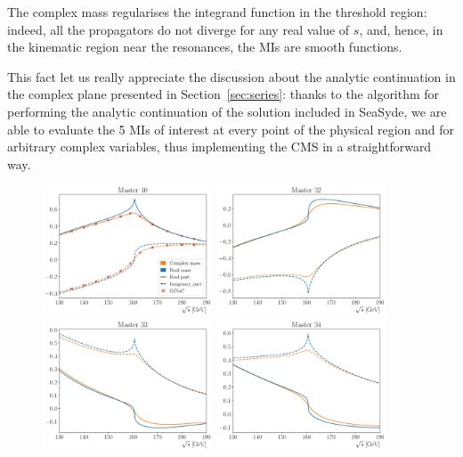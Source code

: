\documentclass[final,1p,times]{elsarticle}
\begin{document}
The complex mass regularises the integrand function in the threshold region: indeed, all the propagators
\be
\ee
do not diverge for any real value of $s$, and, hence, in the kinematic region near the resonances, the MIs are smooth functions.

This fact let us really appreciate the discussion about the analytic continuation in the complex plane presented in Section~\ref{sec:series}:
thanks to the algorithm for performing the analytic continuation of the solution included in {\sc SeaSyde}, we are able to evaluate the 5 MIs of interest at every point of the physical region and for arbitrary complex variables, thus implementing the CMS in a straightforward way.

\begin{figure}[ht!]
    \centering
    \includegraphics[width=0.45\textwidth]{master10_legend.pdf}
    \includegraphics[width=0.45\textwidth]{master32.pdf}
    \includegraphics[width=0.45\textwidth]{master33.pdf}
    \includegraphics[width=0.45\textwidth]{master34.pdf}

\end{figure}
\end{document}
